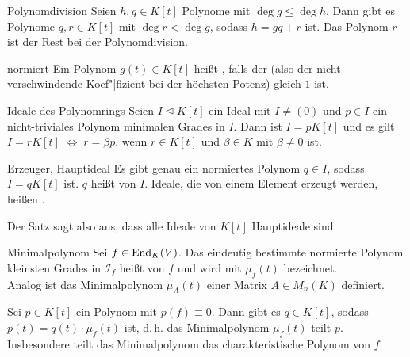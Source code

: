 \begin{Satz}{Polynomdivision}
    Seien $h, g \in K[t]$ Polynome mit $\deg g \le \deg h$.
    Dann gibt es Polynome $q, r \in K[t]$ mit $\deg r < \deg g$, sodass
    $h = gq + r$ ist.
    Das Polynom $r$ ist der Rest bei der Polynomdivision.
\end{Satz}

\begin{Def}{normiert}
    Ein Polynom $g(t) \in K[t]$ heißt , falls der
    (also der nicht-verschwindende Koef"|fizient
    bei der höchsten Potenz) gleich $1$ ist.
\end{Def}

\begin{Satz}{Ideale des Polynomrings}
    Seien $I \trianglelefteq K[t]$ ein Ideal mit $I \not= (0)$ und
    $p \in I$ ein nicht-triviales Polynom minimalen Grades in $I$.
    Dann ist $I = p K[t]$ und es gilt
    $I = r K[t] \;\Leftrightarrow\; r = \beta p$, wenn $r \in K[t]$ und
    $\beta \in K$ mit $\beta \not= 0$ ist.
\end{Satz}

\begin{Def}{Erzeuger, Hauptideal}
    Es gibt genau ein normiertes Polynom $q \in I$, sodass $I = q K[t]$ ist.
    $q$ heißt  von $I$.
    Ideale, die von einem Element erzeugt werden, heißen .
\end{Def}

\begin{Bem}
    Der Satz sagt also aus, dass alle Ideale von $K[t]$ Hauptideale sind.
\end{Bem}

\begin{Def}{Minimalpolynom}
    Sei $f \in \operatorname{End}_K(V)$.
    Das eindeutig bestimmte normierte Polynom kleinsten Grades
    in $\mathcal{I}_f$ heißt  von $f$ und wird
    mit $\mu_f(t)$ bezeichnet. \\
    Analog ist das Minimalpolynom $\mu_A(t)$ einer Matrix $A \in M_n(K)$
    definiert.
\end{Def}

\begin{Kor}
    Sei $p \in K[t]$ ein Polynom mit $p(f) \equiv 0$.
    Dann gibt es $q \in K[t]$, sodass \\
    $p(t) = q(t) \cdot \mu_f(t)$ ist,
    d.\,h. das Minimalpolynom $\mu_f(t)$ teilt $p$.
    Insbesondere teilt das Minimalpolynom das charakteristische Polynom von
    $f$.
\end{Kor}

